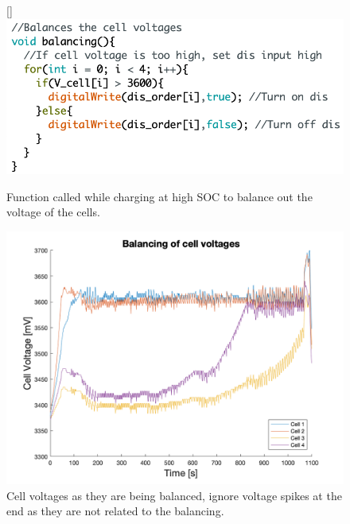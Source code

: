 \documentclass[a4paper]{article}
\begin{document}
\begin{figure}[H]
    \centering
    \begin{minipage}[b]{0.49\textwidth}
        \raisebox{30pt}[\dimexpr{}\baselineskip\relax]{%
        \includegraphics[width=\textwidth]{Balancing_code2.png}
        }%
        \caption{Function called while charging at high SOC to balance out the voltage of the cells.}
        \label{fig:balancingCode}
    \end{minipage}
    \hfill
    \begin{minipage}[b]{0.49\textwidth}
      \includegraphics[width=\textwidth]{balancing.png}
      \caption{Cell voltages as they are being balanced, ignore voltage spikes at the end as they are not related to the balancing.}
      \label{fig:balancing}
    \end{minipage}
\end{figure}
\end{document}
